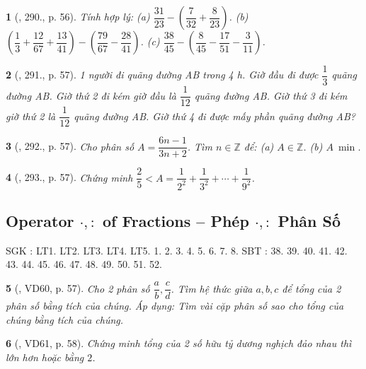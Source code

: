 \documentclass{article}
\newtheorem{baitoan}{}
\begin{document}
\begin{baitoan}[\cite{Tuyen_Toan_6}, 290., p. 56]
	Tính hợp lý: (a) $\dfrac{31}{23} - \left(\dfrac{7}{32} + \dfrac{8}{23}\right)$. (b) $\left(\dfrac{1}{3} + \dfrac{12}{67} + \dfrac{13}{41}\right) - \left(\dfrac{79}{67} - \dfrac{28}{41}\right)$. (c) $\dfrac{38}{45} - \left(\dfrac{8}{45} - \dfrac{17}{51} - \dfrac{3}{11}\right)$.
\end{baitoan}

\begin{baitoan}[\cite{Tuyen_Toan_6}, 291., p. 57]
	1 người đi quãng đường AB trong {\rm4 h}. Giờ đầu đi được $\dfrac{1}{3}$ quãng đường AB. Giờ thứ 2 đi kém giờ đầu là $\dfrac{1}{12}$ quãng đường AB. Giờ thứ 3 đi kém giờ thứ 2 là $\dfrac{1}{12}$ quãng đường AB. Giờ thứ 4 đi được mấy phần quãng đường AB?
\end{baitoan}

\begin{baitoan}[\cite{Tuyen_Toan_6}, 292., p. 57]
	Cho phân số $A = \dfrac{6n - 1}{3n + 2}$. Tìm $n\in\mathbb{Z}$ để: (a) $A\in\mathbb{Z}$. (b) $A\ \min$.
\end{baitoan}

\begin{baitoan}[\cite{Tuyen_Toan_6}, 293., p. 57]
	Chứng minh $\dfrac{2}{5} < A = \dfrac{1}{2^2} + \dfrac{1}{3^2} + \cdots + \dfrac{1}{9^2}$.
\end{baitoan}

\subsection{Operator $\cdot,:$ of Fractions -- Phép $\cdot,:$ Phân Số}
SGK \cite[Chap. V, \S4, pp. 40--43]{SGK_Toan_6_Canh_Dieu_tap_2}: LT1. LT2. LT3. LT4. LT5. 1. 2. 3. 4. 5. 6. 7. 8. SBT \cite[Chap. V, \S4, pp. 40--42]{SBT_Toan_6_Canh_Dieu_tap_2}: 38. 39. 40. 41. 42. 43. 44. 45. 46. 47. 48. 49. 50. 51. 52.

\begin{baitoan}[\cite{Tuyen_Toan_6}, VD60, p. 57]
	Cho 2 phân số $\dfrac{a}{b},\dfrac{c}{d}$. Tìm hệ thức giữa $a,b,c$ để tổng của 2 phân số bằng tích của chúng. Áp dụng: Tìm vài cặp phân số sao cho tổng của chúng bằng tích của chúng.
\end{baitoan}

\begin{baitoan}[\cite{Tuyen_Toan_6}, VD61, p. 58]
	Chứng minh tổng của 2 số hữu tỷ dương nghịch đảo nhau thì lớn hơn hoặc bằng $2$.
\end{baitoan}
\end{document}
